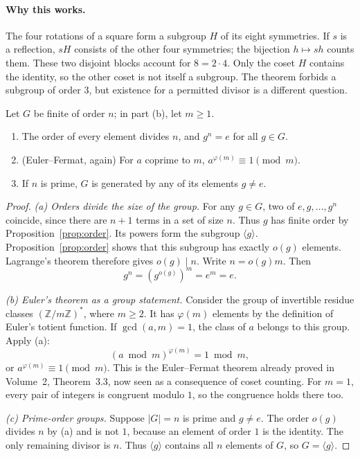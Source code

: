 \paragraph{Why this works.}
The four rotations of a square form a subgroup $H$ of its eight symmetries.
If $s$ is a reflection, $sH$ consists of the other four symmetries; the
bijection $h\mapsto sh$ counts them. These two disjoint blocks account for
$8=2\cdot4$. Only the coset $H$ contains the identity, so the other coset
is not itself a subgroup. The theorem forbids a subgroup of order $3$,
but existence for a permitted divisor is a different question.

\begin{corollary}\label{cor:lagrange}
Let $G$ be finite of order $n$; in part (b), let $m\ge1$.
\begin{enumerate}[label=(\alph*)]
\item The order of every element divides $n$, and $g^n=e$ for all $g\in G$.
\item (Euler--Fermat, again) For $a$ coprime to $m$, $a^{\varphi(m)}\equiv1\pmod m$.
\item If $n$ is prime, $G$ is generated by any of its elements $g\ne e$.
\end{enumerate}
\end{corollary}
\begin{proof}
\emph{(a) Orders divide the size of the group.}
For any $g\in G$, two of $e,g,\ldots,g^n$ coincide, since there are $n+1$ terms in a set of size $n$. Thus $g$ has finite order by Proposition~\ref{prop:order}. Its powers form the subgroup
$\langle g\rangle$. Proposition~\ref{prop:order} shows
that this subgroup has exactly $o(g)$ elements.
Lagrange's theorem therefore gives $o(g)\mid n$.
Write $n=o(g)m$. Then
\[
g^n=(g^{o(g)})^m=e^m=e.
\]

\emph{(b) Euler's theorem as a group statement.}
Consider the group of invertible residue classes
$(\mathbb Z/m\mathbb Z)^*$, where $m\ge2$.
It has $\varphi(m)$ elements by the definition of
Euler's totient function. If $\gcd(a,m)=1$, the
class of $a$ belongs to this group. Apply (a):
\[
(a\bmod m)^{\varphi(m)}=1\bmod m,
\]
or $a^{\varphi(m)}\equiv1\pmod m$.
This is the Euler--Fermat theorem already proved in Volume~2, Theorem~3.3,
now seen as a consequence of coset counting.
For $m=1$, every pair of integers is congruent modulo $1$, so the congruence holds there too.

\emph{(c) Prime-order groups.}
Suppose $|G|=n$ is prime and $g\ne e$.
The order $o(g)$ divides $n$ by (a) and is not $1$,
because an element of order $1$ is the identity.
The only remaining divisor is $n$.
Thus $\langle g\rangle$ contains all $n$ elements of $G$,
so $G=\langle g\rangle$.
\end{proof}

